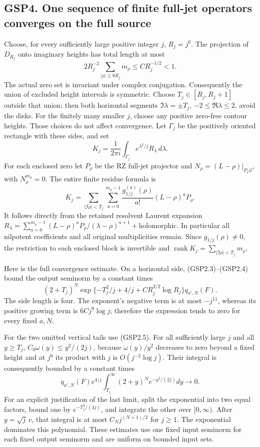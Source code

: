 \subsection{GSP4. One sequence of finite full-jet operators converges on
the full
source}\label{gsp4.-one-sequence-of-finite-full-jet-operators-converges-on-the-full-source}

Choose, for every sufficiently large positive integer \(j\),
\(R_j=j^6\). The projection of \(D_{R_j}\) onto imaginary heights has
total length at most \[
2R_j^{-2}\sum_{|\rho|\le8R_j}m_\rho\le C R_j^{-1/2}<1.
\tag{GSP4.1}
\] The actual zero set is invariant under complex conjugation.
Consequently the union of excluded height intervals is symmetric. Choose
\(T_j\in[R_j,R_j+1]\) outside that union; then both horizontal segments
\(\Im\lambda=\pm T_j\), \(-2\le\Re\lambda\le2\), avoid the disks. For
the finitely many smaller \(j\), choose any positive zero-free contour
heights. Those choices do not affect convergence. Let \(\Gamma_j\) be
the positively oriented rectangle with these sides, and set \[
K_j=\frac1{2\pi i}\int_{\Gamma_j}e^{\lambda^2/j}R_\lambda\,d\lambda.
\tag{GSP4.2}
\] For each enclosed zero let \(P_\rho\) be the RZ full-jet projector
and \(N_\rho=(L-\rho)|_{P_\rho\mathcal Q}\), with \(N_\rho^{m_\rho}=0\).
The entire finite residue formula is \[
K_j=\sum_{|\Im\rho|<T_j}\sum_{a=0}^{m_\rho-1}
\frac{g_{1/j}^{(a)}(\rho)}{a!}(L-\rho)^aP_\rho.
\tag{GSP4.3}
\] It follows directly from the retained resolvent Laurent expansion
\(R_\lambda=\sum_{a=0}^{m_\rho-1}(L-\rho)^aP_\rho/(\lambda-\rho)^{a+1}+\text{holomorphic}\).
In particular all nilpotent coefficients and all original multiplicities
remain. Since \(g_{1/j}(\rho)\ne0\), the restriction to each enclosed
block is invertible and
\(\operatorname{rank}K_j=\sum_{|\Im\rho|<T_j}m_\rho\).

Here is the full convergence estimate. On a horizontal side,
(GSP2.3)--(GSP2.4) bound the output seminorm by a constant times \[
(2+T_j)^N\exp\{-T_j^2/j+4/j+C R_j^{3/2}\log R_j\}
q_{a',N}(F).
\tag{GSP4.4}
\] The side length is four. The exponent's negative term is at most
\(-j^{11}\), whereas its positive growing term is \(6Cj^9\log j\);
therefore the expression tends to zero for every fixed \(a,N\).

For the two omitted vertical tails use (GSP2.5). For all sufficiently
large \(j\) and all \(y\ge T_j\), \(C_0\omega(y)\le y^2/(2j)\), because
\(\omega(y)/y^2\) decreases to zero beyond a fixed height and at \(j^6\)
its product with \(j\) is \(O(j^{-2}\log j)\). Their integral is
consequently bounded by a constant times \[
q_{a',N}(F)e^{4/j}\int_{T_j}^\infty(2+y)^N e^{-y^2/(2j)}dy\longrightarrow0.
\tag{GSP4.5}
\] For an explicit justification of the last limit, split the
exponential into two equal factors, bound one by \(e^{-T_j^2/(4j)}\),
and integrate the other over \([0,\infty)\). After \(y=\sqrt j\,v\),
that integral is at most \(C_N j^{(N+1)/2}\) for \(j\ge1\). The
exponential dominates this polynomial. These estimates use one fixed
input seminorm for each fixed output seminorm and are uniform on bounded
input sets.

